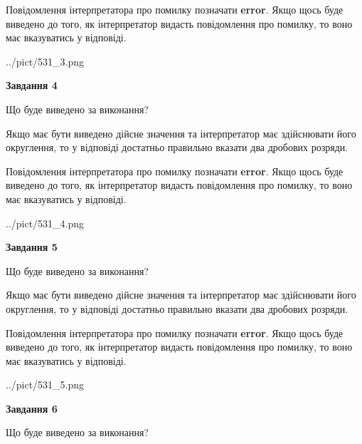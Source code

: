\documentclass[12pt, ukrainian]{article}
\begin{document}
{\begin {Large}
Повідомлення інтерпретатора про помилку позначати \textbf{error}.
Якщо щось буде виведено до того, як інтерпретатор видасть повідомлення про помилку, 
то воно має вказуватись у відповіді. \par

\begin{center}
	{../pict/531_3.png}
\end{center}
\newpage

{\begin {center}\textbf{Завдання 4}\end {center}}\par
Що буде виведено за виконання? \par

Якщо має бути виведено дійсне значення та інтерпретатор має здійснювати його округлення, 
то у відповіді достатньо правильно вказати два дробових розряди.

Повідомлення інтерпретатора про помилку позначати \textbf{error}.
Якщо щось буде виведено до того, як інтерпретатор видасть повідомлення про помилку, 
то воно має вказуватись у відповіді. \par

\begin{center}
	{../pict/531_4.png}
\end{center}
\newpage

{\begin {center}\textbf{Завдання 5}\end {center}}\par
Що буде виведено за виконання? \par

Якщо має бути виведено дійсне значення та інтерпретатор має здійснювати його округлення, 
то у відповіді достатньо правильно вказати два дробових розряди.

Повідомлення інтерпретатора про помилку позначати \textbf{error}.
Якщо щось буде виведено до того, як інтерпретатор видасть повідомлення про помилку, 
то воно має вказуватись у відповіді. \par

\begin{center}
	{../pict/531_5.png}
\end{center}
\newpage

{\begin {center}\textbf{Завдання 6}\end {center}}\par
Що буде виведено за виконання? \par


\end{Large}}
\end{document}
